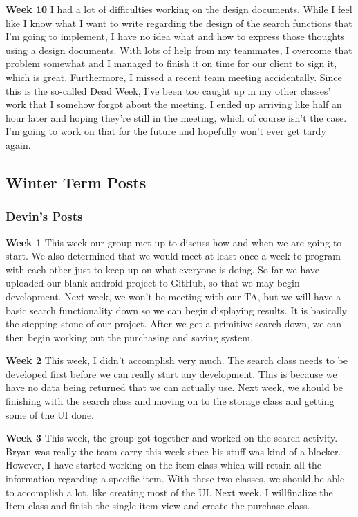 \documentclass[journal,compsoc, 10pt, draftclsnofoot, onecolumn]{IEEEtran}
\begin{document}
\textbf{Week 10}\newline
I had a lot of difficulties working on the design documents. While I feel like
 I know what I want to write regarding the design of the search functions 
 that I'm going to implement, I have no idea what and how to express 
 those thoughts using a design documents. With lots of help from my 
 teammates, I overcome that problem somewhat and I managed to 
 finish it on time for our client to sign it, which is great. Furthermore, 
 I missed a recent team meeting accidentally. Since this is the so-called 
 Dead Week, I've been too caught up in my other classes' work that I 
 somehow forgot about the meeting. I ended up arriving like half an hour 
 later and hoping they're still in the meeting, which of course isn't the case. 
 I'm going to work on that for the future and hopefully won't ever get 
 tardy again.

\subsection{Winter Term Posts}
\subsubsection*{Devin's Posts}
\textbf{Week 1}\newline
This week our group met up to discuss how and when we are going to start. We 
also determined that we would meet at least once a week to program with each 
other just to keep up on what everyone is doing. So far we have uploaded our 
blank android project to GitHub, so that we may begin development. Next week, 
we won't be meeting with our TA, but we will have a basic search functionality 
down so we can begin displaying results. It is basically the stepping stone of our
 project. After we get a primitive search down, we can then begin working out 
the purchasing and saving system.\newline

\textbf{Week 2}\newline
This week, I didn't accomplish very much. The search class needs to be developed first before
we can really start any development. This is because we have no data being returned that we 
can actually use. Next week, we should be finishing with the search class and moving on to the
storage class and getting some of the UI done.\newline

\textbf{Week 3}\newline
This week, the group got together and worked on the search activity. Bryan was really the team
carry this week since his stuff was kind of a blocker. However, I have started working on the
item class which will retain all the information regarding a specific item. With these two
classes, we should be able to accomplish a lot, like creating most of the UI. Next week, 
I willfinalize the Item class and finish the single item view and create the purchase
class.\newline
\end{document}
